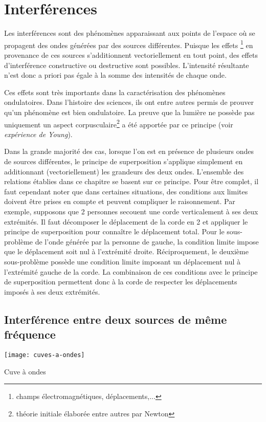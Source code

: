 \chapter{Interférences}
Les interférences sont des phénomènes apparaissant aux points de l'espace où se propagent des ondes générées par des sources différentes. Puisque les effets \footnote{champs électromagnétiques, déplacements,...} en provenance de ces sources s'additionnent vectoriellement en tout point, des effets d'interférence constructive ou destructive sont possibles. L'intensité résultante n'est donc a priori pas égale à la somme des intensités de chaque onde. 

Ces effets sont très importants dans la caractérisation des phénomènes ondulatoires. Dans l'histoire des sciences, ils ont entre autres permis de prouver qu'un phénomène est bien ondulatoire. La preuve que la lumière ne possède pas uniquement un aspect corpusculaire\footnote{théorie initiale élaborée entre autres par Newton} a été apportée par ce principe (voir \textit{expérience de Young}).

Dans la grande majorité des cas, lorsque l'on est en présence de plusieurs ondes de sources différentes, le principe de superposition s'applique simplement en additionnant (vectoriellement) les grandeurs des deux ondes. L'ensemble des relations établies dans ce chapitre se basent sur ce principe. Pour être complet, il faut cependant noter que dans certaines situations, des conditions aux limites doivent être prises en compte et peuvent compliquer le raisonnement. Par exemple, supposons que 2 personnes secouent une corde verticalement à ses deux extrémités. Il faut décomposer le déplacement de la corde en 2 et appliquer le principe de superposition pour connaître le déplacement total. Pour le sous-problème de l'onde générée par la personne de gauche, la condition limite impose que le déplacement soit nul à l'extrémité droite. Réciproquement, le deuxième sous-problème possède une condition limite imposant un déplacement nul à l'extrémité gauche de la corde. La combinaison de ces conditions avec le principe de superposition permettent donc à la corde de respecter les déplacements imposés à ses deux extrémités.

\section{Interférence entre deux sources de même fréquence}

\begin{marginfigure}[0cm]
	\texttt{[image: cuves-a-ondes]}
	\caption{Cuve à ondes}
\end{marginfigure}

